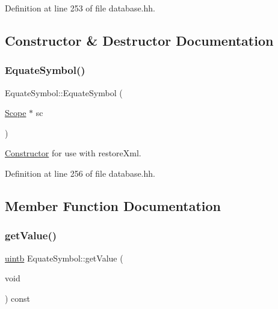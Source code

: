 Definition at line 253 of file database.\+hh.



\subsection{Constructor \& Destructor Documentation}
\mbox{\label{class_equate_symbol_a6bf2ba43204177ae7cb72f5660ba9a55}} 
\subsubsection{\texorpdfstring{EquateSymbol()}{EquateSymbol()}}
{\footnotesize\ttfamily Equate\+Symbol\+::\+Equate\+Symbol (\begin{DoxyParamCaption}\item[{\mbox{\hyperlink{class_scope}{Scope}} $\ast$}]{sc }\end{DoxyParamCaption})\hspace{0.3cm}{\ttfamily [inline]}}



\mbox{\hyperlink{class_constructor}{Constructor}} for use with restore\+Xml. 



Definition at line 256 of file database.\+hh.



\subsection{Member Function Documentation}
\mbox{\label{class_equate_symbol_a9615feaf12dc1c70c43169756ea25e58}} 
\subsubsection{\texorpdfstring{getValue()}{getValue()}}
{\footnotesize\ttfamily \mbox{\hyperlink{types_8h_a2db313c5d32a12b01d26ac9b3bca178f}{uintb}} Equate\+Symbol\+::get\+Value (\begin{DoxyParamCaption}\item[{void}]{ }\end{DoxyParamCaption}) const\hspace{0.3cm}{\ttfamily [inline]}}



